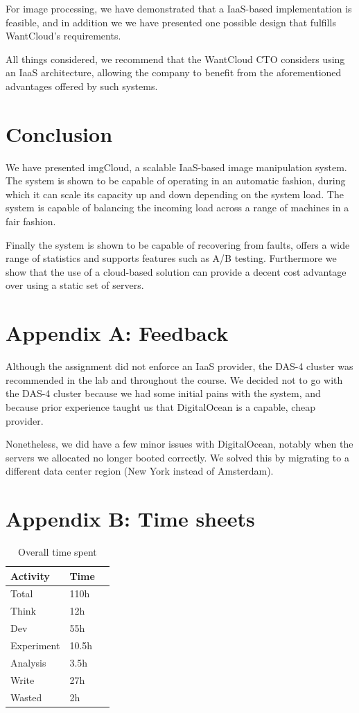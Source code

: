 \documentclass[conference]{IEEEtran}
\begin{document}
For image processing, we have demonstrated that a IaaS-based implementation is feasible, and in addition we we have presented one possible design that fulfills WantCloud's requirements.

All things considered, we recommend that the WantCloud CTO considers using an IaaS architecture, allowing the company to benefit from the aforementioned advantages offered by such systems.

\section{Conclusion}

We have presented imgCloud, a scalable IaaS-based image manipulation system. The system is shown to be capable of operating in an automatic fashion, during which it can scale its capacity up and down depending on the system load. The system is capable of balancing the incoming load across a range of machines in a fair fashion.

Finally the system is shown to be capable of recovering from faults, offers a wide range of statistics and supports features such as A/B testing. Furthermore we show that the use of a cloud-based solution can provide a decent cost advantage over using a static set of servers.

\section*{Appendix A: Feedback}

Although the assignment did not enforce an IaaS provider, the DAS-4 cluster was recommended in the lab and throughout the course. We decided not to go with the DAS-4 cluster because we had some initial pains with the system, and because prior experience taught us that DigitalOcean is a capable, cheap provider.

Nonetheless, we did have a few minor issues with DigitalOcean, notably when the servers we allocated no longer booted correctly. We solved this by migrating to a different data center region (New York instead of Amsterdam).

\section*{Appendix B: Time sheets}

\begin{table}[H]
  \centering
  \begin{tabular}{| l | l | l |}
    \hline
    Activity & Time \\ \hline
    Total & 110h \\ \hline
    Think & 12h \\ \hline
    Dev & 55h \\ \hline
    Experiment & 10.5h \\ \hline
    Analysis & 3.5h \\ \hline
    Write & 27h \\ \hline
    Wasted & 2h \\ \hline
  \end{tabular}
  \caption{Overall time spent}
\end{table}
\end{document}

